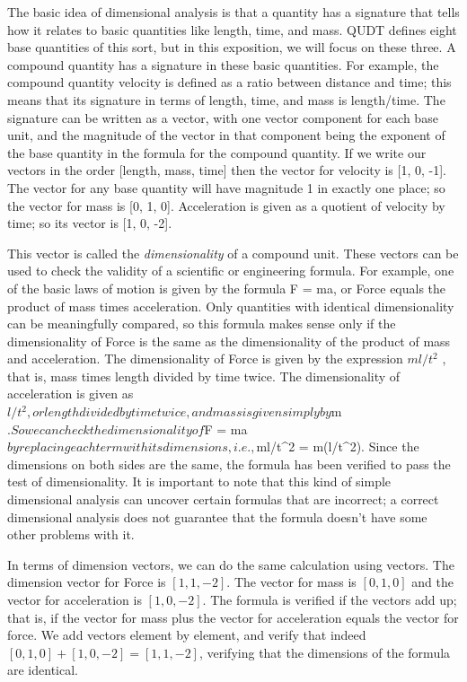 The basic idea of dimensional analysis is that a quantity has a
signature that tells how it relates to
basic quantities like length, time, and mass. QUDT defines eight base
quantities of this sort, but in this exposition, we will focus on these
three. A compound quantity has a signature in these basic quantities.
For example, the compound quantity velocity is defined as a ratio
between distance and time; this means that its signature in terms of
length, time, and mass is length/time. The signature can be written as a
vector, with one vector component for each base unit, and the magnitude
of the vector in that component being the exponent of the base quantity
in the formula for the compound quantity. If we write our vectors in the
order {[}length, mass, time{]} then the vector for velocity is {[}1, 0,
-1{]}. The vector for any base quantity will have magnitude 1 in exactly
one place; so the vector for mass is {[}0, 1, 0{]}. Acceleration is
given as a quotient of velocity by time; so its vector is {[}1, 0,
-2{]}.

This vector is called the \emph{dimensionality} of a compound unit. These
vectors can be used to check the validity of a scientific or engineering
formula. For example, one of the basic laws of motion is given by the
formula F = ma, or Force equals the product of mass times acceleration.
Only quantities with identical dimensionality can be meaningfully
compared, so this formula makes sense only if the dimensionality of
Force is the same as the dimensionality of the product of mass and
acceleration. The dimensionality of Force is given by the expression
$ml/{t^2}$ , that is, mass times length divided by time twice. The
dimensionality of acceleration is given as $l/{t^2}, or length divided by
time twice, and mass is given simply by $m$. So we can check the
dimensionality of $F = ma$ by replacing each term with its dimensions,
i.e., ${ml}/{t^2} = m(l/{t^2}). Since the dimensions on both sides are the
same, the formula has been verified to pass the test of dimensionality.
It is important to note that this kind of simple dimensional analysis
can uncover certain formulas that are incorrect; a correct dimensional
analysis does not guarantee that the formula doesn't have some other
problems with it.

In terms of dimension vectors, we can do the same calculation using
vectors. The dimension vector for Force is $[1, 1, -2]$. The vector
for mass is $[0, 1, 0]$ and the vector for acceleration is $[1, 0,
-2]$. The formula is verified if the vectors add up; that is, if the
vector for mass plus the vector for acceleration
equals the vector for force. We add vectors element by element, and
verify that indeed $[0, 1, 0] + [1, 0, -2] = [1, 1, -2]$, verifying that the dimensions of the
formula are identical.


